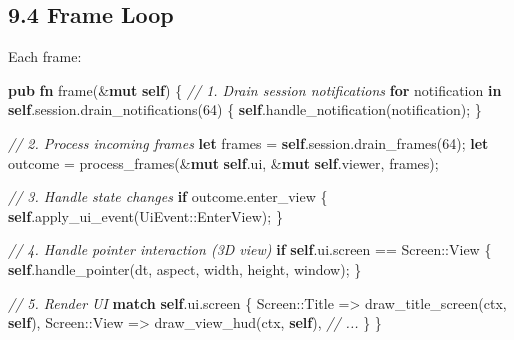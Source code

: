 \documentclass[
]{book}
\newenvironment{Shaded}{}{}
\newcommand{\CommentTok}[1]{\textcolor[rgb]{0.38,0.63,0.69}{\textit{#1}}}
\newcommand{\ControlFlowTok}[1]{\textcolor[rgb]{0.00,0.44,0.13}{\textbf{#1}}}
\newcommand{\DecValTok}[1]{\textcolor[rgb]{0.25,0.63,0.44}{#1}}
\newcommand{\KeywordTok}[1]{\textcolor[rgb]{0.00,0.44,0.13}{\textbf{#1}}}
\newcommand{\NormalTok}[1]{#1}
\newcommand{\OperatorTok}[1]{\textcolor[rgb]{0.40,0.40,0.40}{#1}}
\newcommand{\PreprocessorTok}[1]{\textcolor[rgb]{0.74,0.48,0.00}{#1}}
\begin{document}
\subsection{9.4 Frame Loop}\label{frame-loop}

Each frame:

\begin{Shaded}
\begin{Highlighting}[]
\KeywordTok{pub} \KeywordTok{fn}\NormalTok{ frame(}\OperatorTok{\&}\KeywordTok{mut} \KeywordTok{self}\NormalTok{) }\OperatorTok{\{}
    \CommentTok{// 1. Drain session notifications}
    \ControlFlowTok{for}\NormalTok{ notification }\KeywordTok{in} \KeywordTok{self}\OperatorTok{.}\NormalTok{session}\OperatorTok{.}\NormalTok{drain\_notifications(}\DecValTok{64}\NormalTok{) }\OperatorTok{\{}
        \KeywordTok{self}\OperatorTok{.}\NormalTok{handle\_notification(notification)}\OperatorTok{;}
    \OperatorTok{\}}

    \CommentTok{// 2. Process incoming frames}
    \KeywordTok{let}\NormalTok{ frames }\OperatorTok{=} \KeywordTok{self}\OperatorTok{.}\NormalTok{session}\OperatorTok{.}\NormalTok{drain\_frames(}\DecValTok{64}\NormalTok{)}\OperatorTok{;}
    \KeywordTok{let}\NormalTok{ outcome }\OperatorTok{=}\NormalTok{ process\_frames(}\OperatorTok{\&}\KeywordTok{mut} \KeywordTok{self}\OperatorTok{.}\NormalTok{ui}\OperatorTok{,} \OperatorTok{\&}\KeywordTok{mut} \KeywordTok{self}\OperatorTok{.}\NormalTok{viewer}\OperatorTok{,}\NormalTok{ frames)}\OperatorTok{;}

    \CommentTok{// 3. Handle state changes}
    \ControlFlowTok{if}\NormalTok{ outcome}\OperatorTok{.}\NormalTok{enter\_view }\OperatorTok{\{}
        \KeywordTok{self}\OperatorTok{.}\NormalTok{apply\_ui\_event(}\PreprocessorTok{UiEvent::}\NormalTok{EnterView)}\OperatorTok{;}
    \OperatorTok{\}}

    \CommentTok{// 4. Handle pointer interaction (3D view)}
    \ControlFlowTok{if} \KeywordTok{self}\OperatorTok{.}\NormalTok{ui}\OperatorTok{.}\NormalTok{screen }\OperatorTok{==} \PreprocessorTok{Screen::}\NormalTok{View }\OperatorTok{\{}
        \KeywordTok{self}\OperatorTok{.}\NormalTok{handle\_pointer(dt}\OperatorTok{,}\NormalTok{ aspect}\OperatorTok{,}\NormalTok{ width}\OperatorTok{,}\NormalTok{ height}\OperatorTok{,}\NormalTok{ window)}\OperatorTok{;}
    \OperatorTok{\}}

    \CommentTok{// 5. Render UI}
    \ControlFlowTok{match} \KeywordTok{self}\OperatorTok{.}\NormalTok{ui}\OperatorTok{.}\NormalTok{screen }\OperatorTok{\{}
        \PreprocessorTok{Screen::}\NormalTok{Title }\OperatorTok{=\textgreater{}}\NormalTok{ draw\_title\_screen(ctx}\OperatorTok{,} \KeywordTok{self}\NormalTok{)}\OperatorTok{,}
        \PreprocessorTok{Screen::}\NormalTok{View }\OperatorTok{=\textgreater{}}\NormalTok{ draw\_view\_hud(ctx}\OperatorTok{,} \KeywordTok{self}\NormalTok{)}\OperatorTok{,}
        \CommentTok{// ...}
    \OperatorTok{\}}
\OperatorTok{\}}
\end{Highlighting}
\end{Shaded}
\end{document}
